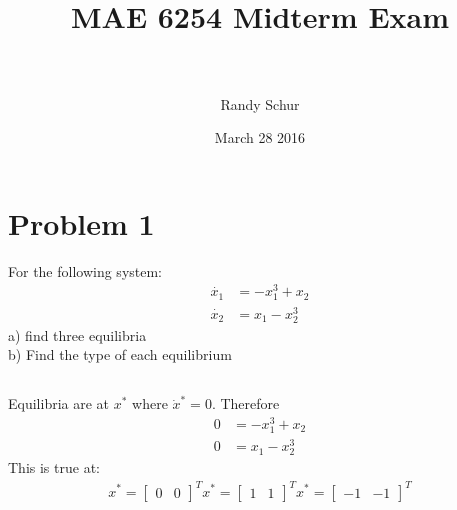 \documentclass[paper=a4, fontsize=11pt]{scrartcl} %
\title{	
\normalfont \normalsize 
\horrule{0.5pt} \\[0.4cm] %
\huge MAE 6254 Midterm Exam \\ %
\horrule{2pt} \\[0.5cm] %
}
\author{Randy Schur} %
\date{\normalsize March 28 2016} %
\numberwithin{equation}{section} %
\numberwithin{figure}{section} %
\numberwithin{table}{section} %
\begin{document}
\maketitle %


\section{Problem 1}
For the following system: 
\begin{align*} 
\dot{x_1} &= -x_1^3 + x_2 \\
\dot{x_2} &= x_1 - x_2^3				
\end{align*}
a) find three equilibria \\
b) Find the type of each equilibrium
\subsection{}
Equilibria are at $x^*$ where $\dot{x}^*=0$. Therefore 
\begin{align*}
0 &= -x_1^3 + x_2 \\
0 &= x_1 - x_2^3
\end{align*}
This is true at:
\begin{align}
x^* = \begin{bmatrix}0 & 0\end{bmatrix}^T 
x^* = \begin{bmatrix}1 & 1\end{bmatrix}^T 
x^* = \begin{bmatrix}-1 & -1\end{bmatrix}^T 
\end{align}
\end{document}
